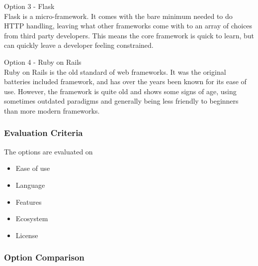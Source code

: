 \documentclass[onecolumn, draftclsnofoot,10pt, compsoc]{IEEEtran}
\begin{document}
{\medskip

\noindent Option 3 - Flask \\
\noindent Flask is a micro-framework. It comes with the bare minimum needed to do HTTP handling, leaving
what other frameworks come with to an array of choices from third party developers. This means the core
framework is quick to learn, but can quickly leave a developer feeling constrained. 

\medskip

\noindent Option 4 - Ruby on Rails \\
\noindent Ruby on Rails is the old standard of web frameworks. It was the original batteries included
framework, and has over the years been known for its ease of use. However, the framework is quite old
and shows some signs of age, using sometimes outdated paradigms and generally being less friendly to beginners than more modern frameworks. 

\medskip

\subsubsection{Evaluation Criteria}
{\noindent The options are evaluated on

\begin{itemize}
\item Ease of use
\item Language
\item Features
\item Ecosystem
\item License
\end{itemize}

 \par}


\newpage
\subsubsection{Option Comparison} ~\\

}
\end{document}
